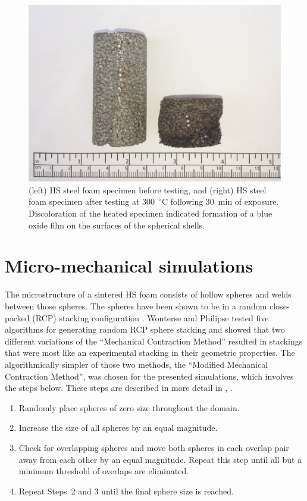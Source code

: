 \documentclass[review]{elsarticle}
\begin{document}
\begin{figure}[htbp]
	\begin{center}
		\includegraphics[width=0.75\linewidth]
		{Tex-Figures/Fig09-Blue_brittleness.pdf}
		\caption{(left) HS steel foam specimen before testing, and (right) HS steel foam specimen after testing at 300~$^\circ\mathrm{C}$ following 30~min of exposure. Discoloration of the heated specimen indicated formation of a blue oxide film on the surfaces of the spherical shells.}
		\label{fig:BlueOxide}
	\end{center}
\end{figure}

\FloatBarrier

\section{Micro-mechanical simulations}

The microstructure of a sintered HS foam consists of hollow spheres and welds between those spheres. The spheres have been shown to be in a random close-packed (RCP) stacking configuration \cite{Gaoetal2008}. Wouterse and Philipse \cite{WouPhi2006} tested five algorithms for generating random RCP sphere stacking and showed that two different variations of the ``Mechanical Contraction Method'' resulted in stackings that were most like an experimental stacking in their geometric properties. The algorithmically simpler of those two methods, the ``Modified Mechanical Contraction Method'', was chosen for the presented simulations, which involves the steps below. These steps are described in more detail in \cite{Kansaletal2002}, \cite{WilliamsandPhilipse2003}.

\begin{enumerate}
	\item Randomly place spheres of zero size throughout the domain.
	\item Increase the size of all spheres by an equal magnitude.
	\item Check for overlapping spheres and move both spheres in each overlap pair away from each other by an equal magnitude. Repeat this step until all but a minimum threshold of overlaps are eliminated.
	\item Repeat Steps~2 and 3 until the final sphere size is reached.
\end{enumerate}
\end{document}
